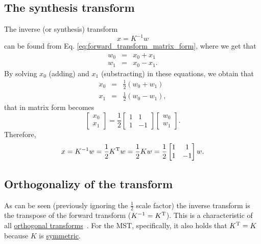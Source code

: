 \subsection{The synthesis transform}
The inverse (or synthesis) transform
\begin{equation}
  x = K^{-1}w
  \label{eq:inverse_transform}
\end{equation}
can be found from Eq. \ref{eq:forward_transform_matrix_form}, where we
get that
\begin{equation}
  \begin{array}{rcl}
  w_0 & = & x_0 + x_1\\
  w_1 & = & x_0 - x_1.
  \end{array}
\end{equation}
By solving $x_0$ (adding) and $x_1$ (substracting) in
these equations, we obtain that
\begin{equation}
  \begin{array}{rcl}
  x_0 & = & \frac{1}{2}(w_0 + w_1)\\
  x_1 & = & \frac{1}{2}(w_0 - w_1),
  \end{array}
\end{equation}
that in matrix form becomes
\begin{equation}
  \begin{bmatrix}
    x_0 \\
    x_1
  \end{bmatrix}
  = \frac{1}{2}
  \begin{bmatrix} 1 & 1 \\ 1 & -1 \end{bmatrix}
  \begin{bmatrix}
    w_0 \\
    w_1
  \end{bmatrix}.
\end{equation}
Therefore,
\begin{equation}
  x = K^{-1}w = \frac{1}{2}K^{\text T}w = \frac{1}{2}Kw = \frac{1}{2}\begin{bmatrix} 1 & 1 \\ 1 & -1 \end{bmatrix}w.
  \label{eq:inverse_transform_matrix_form}
\end{equation}

\subsection{Orthogonalizy of the transform}
As can be seen (previously ignoring the $\frac{1}{2}$ scale factor)
the inverse transform is the transpose of the forward transform
($K^{-1}=K^{\text T}$). This is a characteristic of all
\href{https://en.wikipedia.org/wiki/Orthogonal_transformation}{orthogonal
  transforms}~\cite{sayood2017introduction}. For the MST,
specifically, it also holds that $K^{\text T}=K$ because $K$ is
\href{https://en.wikipedia.org/wiki/Symmetric_matrix}{symmetric}.

